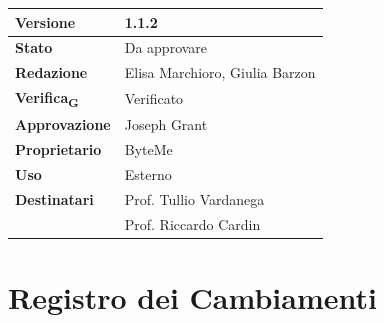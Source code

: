 \documentclass[11pt,a4paper]{article}
\newcommand{\gls}[1]{#1\textsubscript{G}}
\begin{document}
\begin{titlepage}
    \begin{table}[H]
        \centering
        \begin{tabular}{|l|p{5cm}|}
            \hline
            \textbf{Versione} & 1.1.2 \\
            \hline
            \textbf{Stato} & Da approvare \\
            \hline
            \textbf{Redazione} & Elisa Marchioro, Giulia Barzon \\
            \hline
            \textbf{\gls{Verifica}} & Verificato \\
            \hline
            \textbf{Approvazione} & Joseph Grant \\
            \hline
            \textbf{Proprietario} & ByteMe \\
            \hline
            \textbf{Uso} & Esterno \\
            \hline
            \textbf{Destinatari} & Prof. Tullio Vardanega \\ & Prof. Riccardo Cardin \\
            \hline
        \end{tabular}
    \end{table}
    
    \vfill
\end{titlepage}

\thispagestyle{empty}
\section*{Registro dei Cambiamenti}
\end{document}
